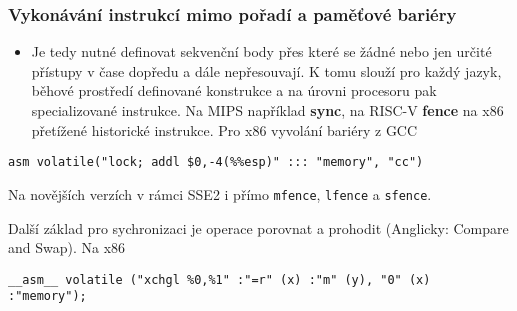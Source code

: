 \documentclass{beamer}
\begin{document}
\begin{frame}[fragile]
\frametitle{Vykonávání instrukcí mimo pořadí  a paměťové bariéry}

\begin{itemize}
 \item Je tedy nutné definovat sekvenční body přes které se žádné nebo jen určité přístupy v čase
       dopředu a dále nepřesouvají. K tomu slouží pro každý jazyk, běhové prostředí definované
       konstrukce a na úrovni procesoru pak specializované instrukce. Na MIPS například \textbf{sync}, na RISC-V \textbf{fence}
       na x86 přetížené historické instrukce. Pro x86 vyvolání bariéry z GCC
\end{itemize}

\begin{verbatim}
asm volatile("lock; addl $0,-4(%%esp)" ::: "memory", "cc")
\end{verbatim}

Na novějších verzích v rámci SSE2 i přímo \texttt{mfence}, \texttt{lfence} a \texttt{sfence}.

Další základ pro sychronizaci je operace porovnat a prohodit (Anglicky: Compare and Swap). Na x86

\begin{verbatim}
__asm__ volatile ("xchgl %0,%1" :"=r" (x) :"m" (y), "0" (x) :"memory");
\end{verbatim}
\end{frame}
\end{document}
